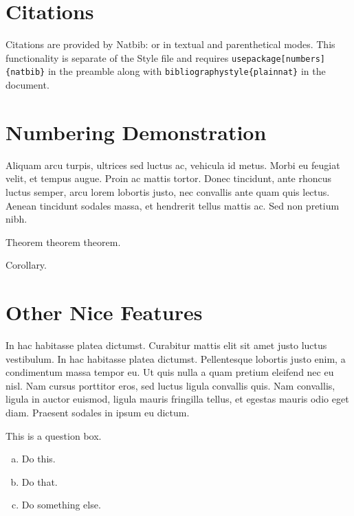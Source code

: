 \documentclass{article}
\begin{document}
\section{Citations}
Citations are provided by Natbib: \cite{lamport1994latex} or in textual \citet{lamport1994latex} and parenthetical \citep{lamport1994latex} modes. This functionality is separate of the Style file and requires \texttt{usepackage[numbers]\{natbib\}} in the preamble along with \texttt{bibliographystyle\{plainnat\}} in the document. 
\section{Numbering Demonstration}
Aliquam arcu turpis, ultrices sed luctus ac, vehicula id metus. Morbi eu feugiat velit, et tempus augue. Proin ac mattis tortor. Donec tincidunt, ante rhoncus luctus semper, arcu lorem lobortis justo, nec convallis ante quam quis lectus. Aenean tincidunt sodales massa, et hendrerit tellus mattis ac. Sed non pretium nibh.

\begin{thm}
Theorem theorem theorem.
\end{thm}
\begin{corr}
Corollary. 
\end{corr}


\section{Other Nice Features} %

In hac habitasse platea dictumst. Curabitur mattis elit sit amet justo luctus vestibulum. In hac habitasse platea dictumst. Pellentesque lobortis justo enim, a condimentum massa tempor eu. Ut quis nulla a quam pretium eleifend nec eu nisl. Nam cursus porttitor eros, sed luctus ligula convallis quis. Nam convallis, ligula in auctor euismod, ligula mauris fringilla tellus, et egestas mauris odio eget diam. Praesent sodales in ipsum eu dictum.

\begin{question}
	This is a question box.
	\begin{enumerate}[(a)]
		\item Do this.
		\item Do that.
		\item Do something else.
	\end{enumerate}
\end{question}
	
\end{document}
